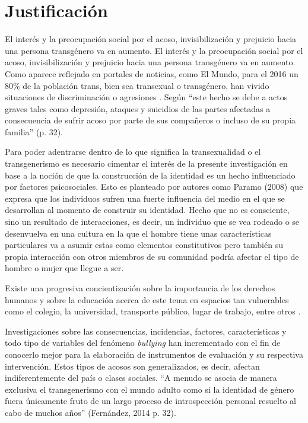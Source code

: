 \section{Justificación}
El interés y la preocupación social por el acoso, invisibilización y prejuicio
hacia una persona transgénero va en aumento. El interés y la preocupación social
por el acoso, invisibilización y prejuicio hacia una persona transgénero va en
aumento. Como aparece reflejado en portales de noticias, como El Mundo, para
el 2016 un 80\% de la población trans, bien sea transexual o transgénero,
han vivido situaciones de discriminación o agresiones \parencite{Alpuente2016}.
Según \textcite{Fernandez2014} “este hecho se debe a actos graves tales como
depresión, ataques y suicidios de las partes afectadas a consecuencia de sufrir
acoso por parte de sus compañeros o incluso de su propia familia” (p. 32).

Para poder adentrarse dentro de lo que significa la transexualidad o el
transgenerismo es necesario cimentar el interés de la presente investigación en
base a la noción de que la construcción de la identidad es un hecho influenciado
por factores psicosociales. Esto es planteado por autores como Paramo (2008) que
expresa que los individuos sufren una fuerte influencia del medio en el que se
desarrollan al momento de construir su identidad. Hecho que no es consciente,
sino un resultado de interacciones, es decir, un individuo que se vea rodeado o
se desenvuelva en una cultura en la que el hombre tiene unas características
particulares va a asumir estas como elementos constitutivos pero también su
propia interacción con otros miembros de su comunidad podría afectar el tipo de
hombre o mujer que llegue a ser.

Existe una progresiva concientización sobre la importancia de los derechos
humanos y sobre la educación acerca de este tema en espacios tan vulnerables
como el colegio, la universidad, transporte público, lugar de trabajo, entre
otros \parencite{Fernandez2014}.

Investigaciones sobre las consecuencias, incidencias, factores, características
y todo tipo de variables del fenómeno \emph{bullying} han incrementado con el
fin de conocerlo mejor para la elaboración de instrumentos de evaluación y su
respectiva intervención. Estos tipos de acosos son generalizados, es decir,
afectan indiferentemente del país o clases sociales. “A menudo se asocia de
manera exclusiva el transgenerismo con el mundo adulto como si la identidad de
género fuera únicamente fruto de un largo proceso de introspección personal
resuelto al cabo de muchos años” (Fernández, 2014 p. 32).

